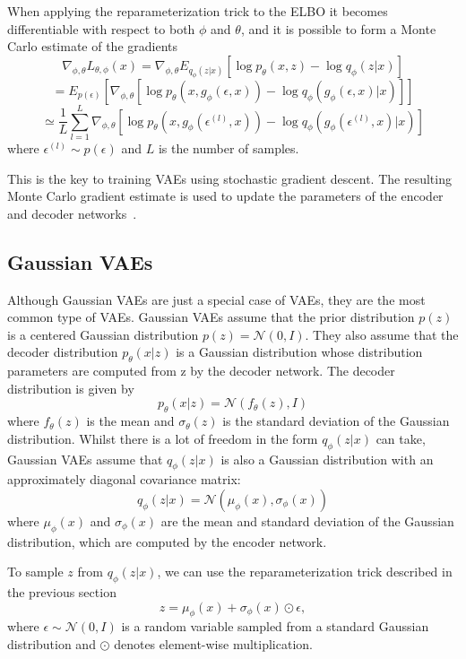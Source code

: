When applying the reparameterization trick to the ELBO it becomes differentiable with respect to both $\phi$ and $\theta$, and it is possible to form a Monte Carlo estimate of the gradients
\[ \nabla_{\phi, \theta} L_{\theta, \phi}(x) = \nabla_{\phi, \theta} E_{q_{\phi}(z|x)} [\log p_{\theta}(x, z) - \log q_{\phi}(z|x)] \]
\[ = E_{p(\epsilon)}[\nabla_{\phi, \theta} [\log p_{\theta}(x, g_{\phi}(\epsilon, x)) - \log q_{\phi}(g_{\phi}(\epsilon, x)|x)]] \]
\[  \simeq \frac{1}{L} \sum_{l=1}^{L} \nabla_{\phi, \theta} [\log p_{\theta}(x, g_{\phi}(\epsilon^{(l)}, x)) - \log q_{\phi}(g_{\phi}(\epsilon^{(l)}, x)|x)] \]
where $\epsilon^{(l)} \sim p(\epsilon)$ and $L$ is the number of samples.

This is the key to training VAEs using stochastic gradient descent. The resulting Monte Carlo gradient estimate is used to update the parameters of the encoder and decoder networks~\cite{Kingma_2019}.


\subsection{Gaussian VAEs}

Although Gaussian VAEs are just a special case of VAEs, they are the most common type of VAEs. Gaussian VAEs assume that the prior distribution $p(z)$ is a centered Gaussian distribution $ p(z) = \mathcal{N}(0, I)$. They also assume that the decoder distribution $p_{\theta}(x|z)$ is a Gaussian distribution whose distribution parameters are computed from z by the decoder network. The decoder distribution is given by
\[ p_{\theta}(x|z) = \mathcal{N}(f_{\theta}(z), I) \]
where $f_{\theta}(z)$ is the mean and $\sigma_{\theta}(z)$ is the standard deviation of the Gaussian distribution. Whilst there is a lot of freedom in the form $q_{\phi}(z|x)$ can take, Gaussian VAEs assume that $q_{\phi}(z|x)$ is also a Gaussian distribution with an approximately diagonal covariance matrix: 
\[ q_{\phi}(z|x) = \mathcal{N}(\mu_{\phi}(x), \sigma_{\phi}(x)) \]
where $\mu_{\phi}(x)$ and $\sigma_{\phi}(x)$ are the mean and standard deviation of the Gaussian distribution, which are computed by the encoder network.

To sample $z$ from $q_{\phi}(z|x)$, we can use the reparameterization trick described in the previous section
\[ z = \mu_{\phi}(x) + \sigma_{\phi}(x) \odot \epsilon, \] 
where $\epsilon \sim \mathcal{N}(0, I)$ is a random variable sampled from a standard Gaussian distribution and $\odot$ denotes element-wise multiplication.


